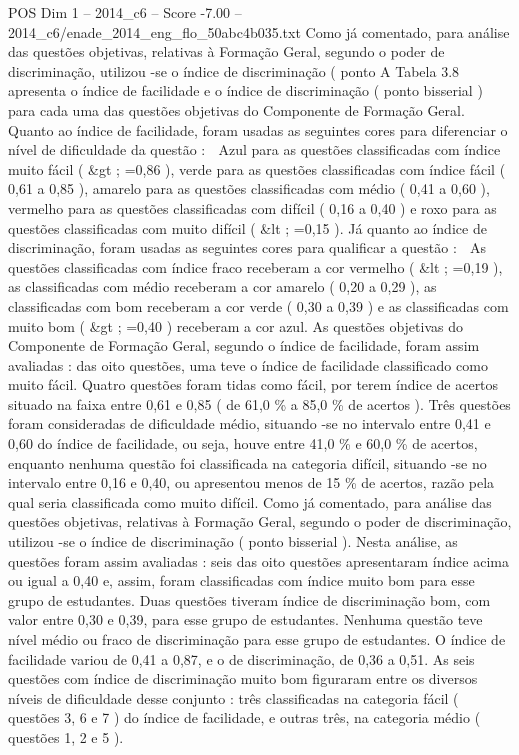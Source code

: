\begin{textsample}{POS Dim 1 – 2014\_c6 – Score -7.00 – 2014\_c6/enade\_2014\_eng\_flo\_50abc4b035.txt}
Como já comentado, para análise das questões objetivas, relativas à Formação Geral, segundo o poder de discriminação, utilizou -se o índice de discriminação ( ponto A Tabela 3.8 apresenta o índice de facilidade e o índice de discriminação ( ponto bisserial ) para cada uma das questões objetivas do Componente de Formação Geral.
Quanto ao índice de facilidade, foram usadas as seguintes cores para diferenciar o nível de dificuldade da questão :  Azul para as questões classificadas com índice muito fácil ( \&gt ; =0,86 ), verde para as questões classificadas com índice fácil ( 0,61 a 0,85 ), amarelo para as questões classificadas com médio ( 0,41 a 0,60 ), vermelho para as questões classificadas com difícil ( 0,16 a 0,40 ) e roxo para as questões classificadas com muito difícil ( \&lt ; =0,15 ).
Já quanto ao índice de discriminação, foram usadas as seguintes cores para qualificar a questão :  As questões classificadas com índice fraco receberam a cor vermelho ( \&lt ; =0,19 ), as classificadas com médio receberam a cor amarelo ( 0,20 a 0,29 ), as classificadas com bom receberam a cor verde ( 0,30 a 0,39 ) e as classificadas com muito bom ( \&gt ; =0,40 ) receberam a cor azul.
As questões objetivas do Componente de Formação Geral, segundo o índice de facilidade, foram assim avaliadas : das oito questões, uma teve o índice de facilidade classificado como muito fácil.
Quatro questões foram tidas como fácil, por terem índice de acertos situado na faixa entre 0,61 e 0,85 ( de 61,0 \% a 85,0 \% de acertos ).
Três questões foram consideradas de dificuldade médio, situando -se no intervalo entre 0,41 e 0,60 do índice de facilidade, ou seja, houve entre 41,0 \% e 60,0 \% de acertos, enquanto nenhuma questão foi classificada na categoria difícil, situando -se no intervalo entre 0,16 e 0,40, ou apresentou menos de 15 \% de acertos, razão pela qual seria classificada como muito difícil.
Como já comentado, para análise das questões objetivas, relativas à Formação Geral, segundo o poder de discriminação, utilizou -se o índice de discriminação ( ponto bisserial ).
Nesta análise, as questões foram assim avaliadas : seis das oito questões apresentaram índice acima ou igual a 0,40 e, assim, foram classificadas com índice muito bom para esse grupo de estudantes.
Duas questões tiveram índice de discriminação bom, com valor entre 0,30 e 0,39, para esse grupo de estudantes.
Nenhuma questão teve nível médio ou fraco de discriminação para esse grupo de estudantes.
O índice de facilidade variou de 0,41 a 0,87, e o de discriminação, de 0,36 a 0,51.
As seis questões com índice de discriminação muito bom figuraram entre os diversos níveis de dificuldade desse conjunto : três classificadas na categoria fácil ( questões 3, 6 e 7 ) do índice de facilidade, e outras três, na categoria médio ( questões 1, 2 e 5 ).

\end{textsample}
